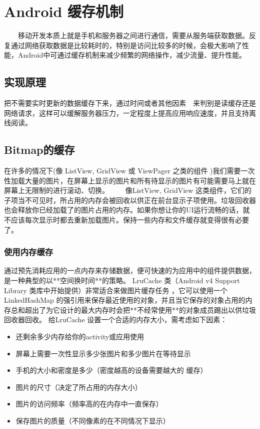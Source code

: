 \documentclass[9pt, b5paper]{article}
\begin{document}
\section{Android 缓存机制}
\label{sec-8}
　　移动开发本质上就是手机和服务器之间进行通信，需要从服务端获取数据。反复通过网络获取数据是比较耗时的，特别是访问比较多的时候，会极大影响了性能，Android中可通过缓存机制来减少频繁的网络操作，减少流量、提升性能。
\subsection{实现原理}
\label{sec-8-1}
把不需要实时更新的数据缓存下来，通过时间或者其他因素　来判别是读缓存还是网络请求，这样可以缓解服务器压力，一定程度上提高应用响应速度，并且支持离线阅读。
\subsection{Bitmap的缓存}
\label{sec-8-2}
在许多的情况下(像 ListView, GridView 或 ViewPager 之类的组件 )我们需要一次性加载大量的图片，在屏幕上显示的图片和所有待显示的图片有可能需要马上就在屏幕上无限制的进行滚动、切换。
  　　像ListView, GridView 这类组件，它们的子项当不可见时，所占用的内存会被回收以供正在前台显示子项使用。垃圾回收器也会释放你已经加载了的图片占用的内存。如果你想让你的UI运行流畅的话，就不应该每次显示时都去重新加载图片。保持一些内存和文件缓存就变得很有必要了。
\subsubsection{使用内存缓存}
\label{sec-8-2-1}
通过预先消耗应用的一点内存来存储数据，便可快速的为应用中的组件提供数据，是一种典型的以**空间换时间**的策略。
LruCache  类（Android v4 Support Library 类库中开始提供）非常适合来做图片缓存任务 ，它可以使用一个LinkedHashMap  的强引用来保存最近使用的对象，并且当它保存的对象占用的内存总和超出了为它设计的最大内存时会把**不经常使用**的对象成员踢出以供垃圾回收器回收。
给LruCache 设置一个合适的内存大小，需考虑如下因素：
\begin{itemize}
\item 还剩余多少内存给你的activity或应用使用
\item 屏幕上需要一次性显示多少张图片和多少图片在等待显示
\item 手机的大小和密度是多少（密度越高的设备需要越大的 缓存）
\item 图片的尺寸（决定了所占用的内存大小）
\item 图片的访问频率（频率高的在内存中一直保存）
\item 保存图片的质量（不同像素的在不同情况下显示）
\end{itemize}
\end{document}
